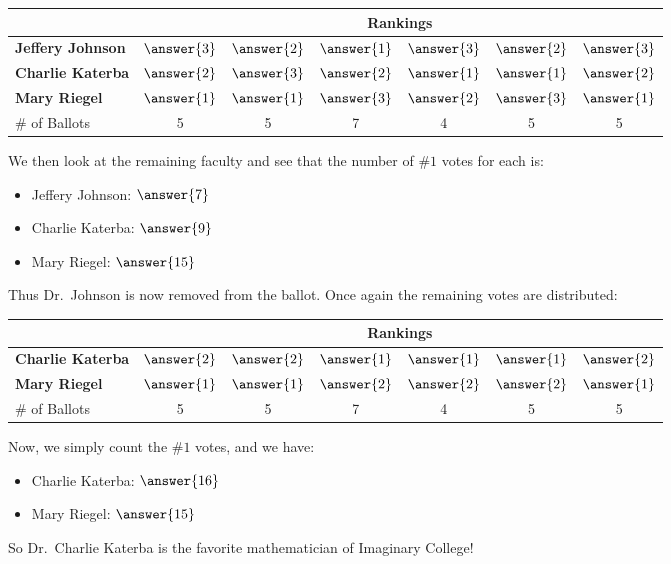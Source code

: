 \documentclass{ximera}
\begin{document}
\begin{question}
\begin{explanation}
\begin{tabular}{|l|c|c|c|c|c|c|}
\multicolumn{1}{c}{}& \multicolumn{6}{c}{\textbf{Rankings}}\\
\hline
\textbf{Jeffery Johnson} &$\answer{3}$ &$\answer{2}$ &$\answer{1}$ &$\answer{3}$&$\answer{2}$&$\answer{3}$\\
\textbf{Charlie Katerba} &$\answer{2}$ &$\answer{3}$ &$\answer{2}$ &$\answer{1}$&$\answer{1}$&$\answer{2}$\\
\textbf{Mary Riegel}       &$\answer{1}$ &$\answer{1}$ &$\answer{3}$ &$\answer{2}$&$\answer{3}$&$\answer{1}$\\
\hline
\# of Ballots                       &5 & 5 &  7 & 4&5&5\\
\hline
\end{tabular}

We then look at the remaining faculty and see that the number of $\#1$ votes for each is:

\begin{itemize}
\item Jeffery Johnson: $\answer{7}$
\item Charlie Katerba: $\answer{9}$
\item Mary Riegel: $\answer{15}$
\end{itemize}

Thus Dr.\ Johnson is now removed from the ballot. Once again the remaining votes are distributed:

\begin{tabular}{|l|c|c|c|c|c|c|}
\multicolumn{1}{c}{}& \multicolumn{6}{c}{\textbf{Rankings}}\\
\hline
\textbf{Charlie Katerba} &$\answer{2}$ &$\answer{2}$ &$\answer{1}$ &$\answer{1}$&$\answer{1}$&$\answer{2}$\\
\textbf{Mary Riegel}       &$\answer{1}$ &$\answer{1}$ &$\answer{2}$ &$\answer{2}$&$\answer{2}$&$\answer{1}$\\
\hline
\# of Ballots                       &5 & 5 &  7 & 4&5&5\\
\hline
\end{tabular}

Now, we simply count the $\#1$ votes, and we have:

\begin{itemize}
\item Charlie Katerba: $\answer{16}$
\item Mary Riegel: $\answer{15}$
\end{itemize}

So Dr.\ Charlie Katerba is the favorite mathematician of Imaginary College!


\end{explanation}




\end{question}      
\end{document}
